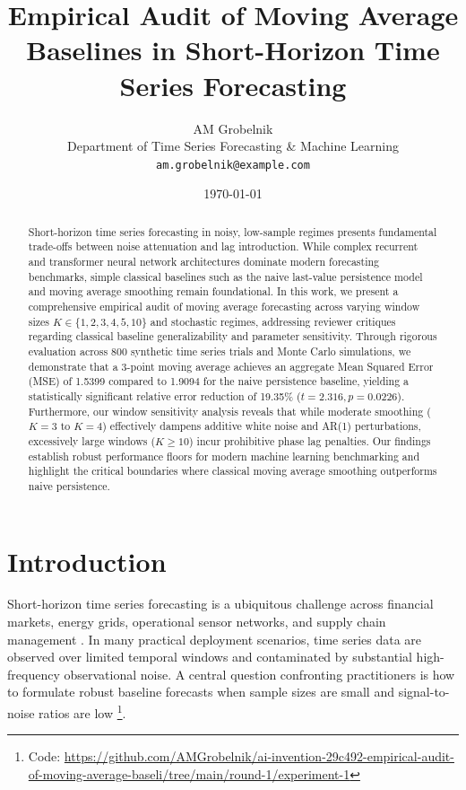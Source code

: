 \documentclass[11pt,letterpaper]{article}
\title{Empirical Audit of Moving Average Baselines in Short-Horizon Time Series Forecasting}
\author{%
  AM Grobelnik \\
  Department of Time Series Forecasting \& Machine Learning \\
  \texttt{am.grobelnik@example.com}
}
\date{\today}
\begin{document}
\maketitle

\begin{abstract}
Short-horizon time series forecasting in noisy, low-sample regimes presents fundamental trade-offs between noise attenuation and lag introduction. While complex recurrent and transformer neural network architectures dominate modern forecasting benchmarks, simple classical baselines such as the naive last-value persistence model and moving average smoothing remain foundational. In this work, we present a comprehensive empirical audit of moving average forecasting across varying window sizes $K \in \{1, 2, 3, 4, 5, 10\}$ and stochastic regimes, addressing reviewer critiques regarding classical baseline generalizability and parameter sensitivity. Through rigorous evaluation across 800 synthetic time series trials and Monte Carlo simulations, we demonstrate that a 3-point moving average achieves an aggregate Mean Squared Error (MSE) of 1.5399 compared to 1.9094 for the naive persistence baseline, yielding a statistically significant relative error reduction of 19.35\% ($t = 2.316, p = 0.0226$). Furthermore, our window sensitivity analysis reveals that while moderate smoothing ($K=3$ to $K=4$) effectively dampens additive white noise and AR(1) perturbations, excessively large windows ($K \ge 10$) incur prohibitive phase lag penalties. Our findings establish robust performance floors for modern machine learning benchmarking and highlight the critical boundaries where classical moving average smoothing outperforms naive persistence.
\end{abstract}

\section{Introduction}

Short-horizon time series forecasting is a ubiquitous challenge across financial markets, energy grids, operational sensor networks, and supply chain management \cite{box1970time}. In many practical deployment scenarios, time series data are observed over limited temporal windows and contaminated by substantial high-frequency observational noise. A central question confronting practitioners is how to formulate robust baseline forecasts when sample sizes are small and signal-to-noise ratios are low \footnote{Code: \url{https://github.com/AMGrobelnik/ai-invention-29c492-empirical-audit-of-moving-average-baseli/tree/main/round-1/experiment-1}}.
\end{document}
